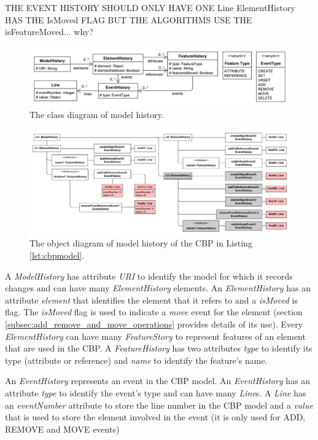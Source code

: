 \documentclass{llncs}
\begin{document}
THE EVENT HISTORY SHOULD ONLY HAVE ONE Line
ElementHistory HAS THE IsMoved FLAG BUT THE ALGORITHMS USE THE isFeatureMoved... why?

\begin{figure}[ht]
\centering
\includegraphics[width=\linewidth]{object_history}
\caption{The class diagram of model history.}
\label{fig:object_history}
\end{figure}

\begin{figure}[ht]
\centering
\includegraphics[width=\linewidth]{history_structure}
\caption{The object diagram of model history of the CBP in Listing \ref{lst:cbpmodel}.}
\label{fig:history_structure}
\end{figure}

A \emph{ModelHistory} has attribute \emph{URI} to identify the model for which it records changes and can have many \emph{ElementHistory} elements.
An \emph{ElementHistory} has an attribute \emph{element} that identifies the element that it refers to and a \emph{isMoved} is flag.
The  \emph{isMoved} flag is used to indicate a \emph{move} event for the element (section \ref{subsec:add_remove_and_move_operations} provides details of its use).
Every \emph{ElementHistory} can have many \emph{FeatureStory} to represent features of an element that are used in the CBP.  	%
A \emph{FeatureHistory} has two attributes \emph{type} to identify its type (attribute or reference) and \emph{name} to identify the feature's name.

An \emph{EventHistory} represents an event in the CBP model.
An \emph{EventHistory} has an attribute \emph{type} to identify the event's type and can have many \emph{Line}s.
A \emph{Line} has an \emph{eventNumber} attribute to store the line number in the CBP model and a \emph{value} that is used to store the element involved in the event (it is only used for ADD, REMOVE and MOVE events)
\end{document}
